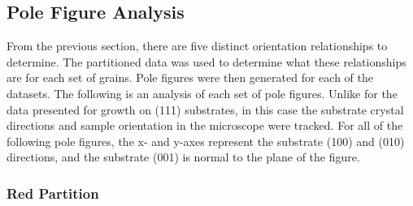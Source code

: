 \subsection{Pole Figure Analysis}
\label{subsec:single.growth.polefigureanalysis}


From the previous section, there are five distinct orientation relationships to determine.
The partitioned data was used to determine what these relationships are for each set of
grains. Pole figures were then generated for each of the datasets. The following is an
analysis of each set of pole figures. Unlike for the data presented for growth on
(111) substrates, in this case the substrate crystal directions and sample
orientation in the microscope were tracked. For all of the following pole figures, the x-
and y-axes represent the substrate (100) and (010) directions, and the substrate (001) is
normal to the plane of the figure.


\subsubsection{Red Partition}
\label{subsubsec:single.growth.red}


